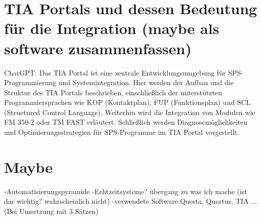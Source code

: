 \section{TIA Portals und dessen Bedeutung für die Integration (maybe als software zusammenfassen)}  
ChatGPT:
Das TIA Portal ist eine zentrale Entwicklungsumgebung für SPS-Programmierung und Systemintegration.  
Hier werden der Aufbau und die Struktur des TIA Portals beschrieben, einschließlich der unterstützten Programmiersprachen wie KOP (Kontaktplan), FUP (Funktionsplan) und SCL (Structured Control Language).  
Weiterhin wird die Integration von Modulen wie FM 350-2 oder TM FAST erläutert.  
Schließlich werden Diagnosemöglichkeiten und Optimierungsstrategien für SPS-Programme im TIA Portal vorgestellt.  
\section{Maybe}
-Automatisierungspyramide
-Echtzeitsysteme? übergang zu was ich mache (ist das wichtig? wahrscheinlich nicht)
-verwendete Software:Questa, Quartus, TIA ... (Bei Umsetzung mit 3 Sätzen)